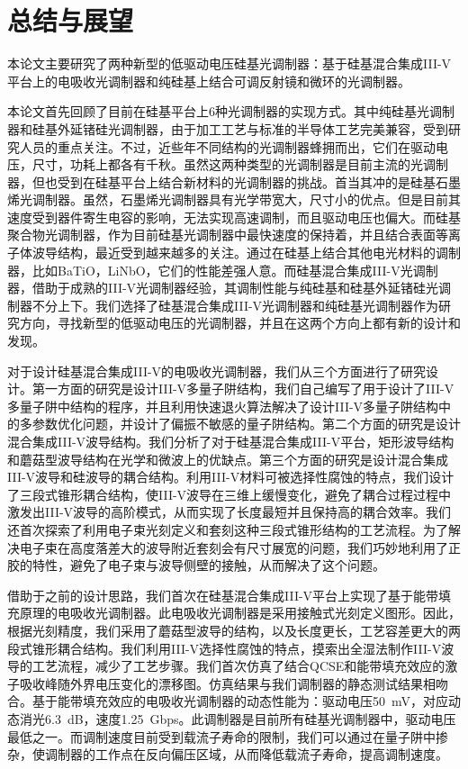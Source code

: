 \chapter{总结与展望}
本论文主要研究了两种新型的低驱动电压硅基光调制器：基于硅基混合集成III-V平台上的电吸收光调制器和纯硅基上结合可调反射镜和微环的光调制器。

本论文首先回顾了目前在硅基平台上6种光调制器的实现方式。其中纯硅基光调制器和硅基外延锗硅光调制器，由于加工工艺与标准的半导体工艺完美兼容，受到研究人员的重点关注。不过，近些年不同结构的光调制器蜂拥而出，它们在驱动电压，尺寸，功耗上都各有千秋。虽然这两种类型的光调制器是目前主流的光调制器，但也受到在硅基平台上结合新材料的光调制器的挑战。首当其冲的是硅基石墨烯光调制器。虽然，石墨烯光调制器具有光学带宽大，尺寸小的优点。但是目前其速度受到器件寄生电容的影响，无法实现高速调制，而且驱动电压也偏大。而硅基聚合物光调制器，作为目前硅基光调制器中最快速度的保持着，并且结合表面等离子体波导结构，最近受到越来越多的关注。通过在硅基上结合其他电光材料的调制器，比如BaTiO，LiNbO，它们的性能差强人意。而硅基混合集成III-V光调制器，借助于成熟的III-V光调制器经验，其调制性能与纯硅基和硅基外延锗硅光调制器不分上下。我们选择了硅基混合集成III-V光调制器和纯硅基光调制器作为研究方向，寻找新型的低驱动电压的光调制器，并且在这两个方向上都有新的设计和发现。

对于设计硅基混合集成III-V的电吸收光调制器，我们从三个方面进行了研究设计。第一方面的研究是设计III-V多量子阱结构，我们自己编写了用于设计了III-V多量子阱中结构的程序，并且利用快速退火算法解决了设计III-V多量子阱结构中的多参数优化问题，并设计了偏振不敏感的量子阱结构。第二个方面的研究是设计混合集成III-V波导结构。我们分析了对于硅基混合集成III-V平台，矩形波导结构和蘑菇型波导结构在光学和微波上的优缺点。第三个方面的研究是设计混合集成III-V波导和硅波导的耦合结构。利用III-V材料可被选择性腐蚀的特点，我们设计了三段式锥形耦合结构，使III-V波导在三维上缓慢变化，避免了耦合过程过程中激发出III-V波导的高阶模式，从而实现了长度最短并且保持高的耦合效率。我们还首次探索了利用电子束光刻定义和套刻这种三段式锥形结构的工艺流程。为了解决电子束在高度落差大的波导附近套刻会有尺寸展宽的问题，我们巧妙地利用了正胶的特性，避免了电子束与波导侧壁的接触，从而解决了这个问题。

借助于之前的设计思路，我们首次在硅基混合集成III-V平台上实现了基于能带填充原理的电吸收光调制器。此电吸收光调制器是采用接触式光刻定义图形。因此，根据光刻精度，我们采用了蘑菇型波导的结构，以及长度更长，工艺容差更大的两段式锥形耦合结构。我们利用III-V选择性腐蚀的特点，摸索出全湿法制作III-V波导的工艺流程，减少了工艺步骤。我们首次仿真了结合QCSE和能带填充效应的激子吸收峰随外界电压变化的漂移图。仿真结果与我们调制器的静态测试结果相吻合。基于能带填充效应的电吸收光调制器的动态性能为：驱动电压50~mV，对应动态消光6.3~dB，速度1.25~Gbps。此调制器是目前所有硅基光调制器中，驱动电压最低之一。而调制速度目前受到载流子寿命的限制，我们可以通过在量子阱中掺杂，使调制器的工作点在反向偏压区域，从而降低载流子寿命，提高调制速度。

